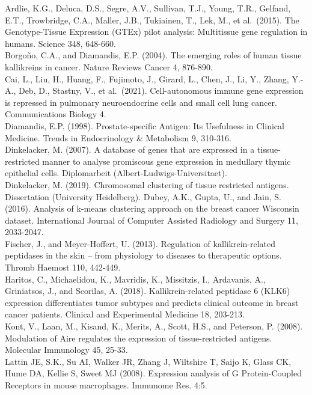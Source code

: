 \documentclass[
]{article}
\begin{document}
Ardlie, K.G., Deluca, D.S., Segre, A.V., Sullivan, T.J., Young, T.R.,
Gelfand, E.T., Trowbridge, C.A., Maller, J.B., Tukiainen, T., Lek, M.,
et al.~(2015). The Genotype-Tissue Expression (GTEx) pilot analysis:
Multitissue gene regulation in humans. Science 348, 648-660.\\
Borgoño, C.A., and Diamandis, E.P. (2004). The emerging roles of human
tissue kallikreins in cancer. Nature Reviews Cancer 4, 876-890.\\
Cai, L., Liu, H., Huang, F., Fujimoto, J., Girard, L., Chen, J., Li, Y.,
Zhang, Y.-A., Deb, D., Stastny, V., et al.~(2021). Cell-autonomous
immune gene expression is repressed in pulmonary neuroendocrine cells
and small cell lung cancer. Communications Biology 4.\\
Diamandis, E.P. (1998). Prostate-specific Antigen: Its Usefulness in
Clinical Medicine. Trends in Endocrinology \& Metabolism 9, 310-316.\\
Dinkelacker, M. (2007). A database of genes that are expressed in a
tissue-restricted manner to analyse promiscous gene expression in
medullary thymic epithelial cells. Diplomarbeit
(Albert-Ludwigs-Universitaet).\\
Dinkelacker, M. (2019). Chromosomal clustering of tissue restricted
antigens. Dissertation (University Heidelberg). Dubey, A.K., Gupta, U.,
and Jain, S. (2016). Analysis of k-means clustering approach on the
breast cancer Wisconsin dataset. International Journal of Computer
Assisted Radiology and Surgery 11, 2033-2047.\\
Fischer, J., and Meyer-Hoffert, U. (2013). Regulation of
kallikrein-related peptidases in the skin -- from physiology to diseases
to therapeutic options. Thromb Haemost 110, 442-449.\\
Haritos, C., Michaelidou, K., Mavridis, K., Missitzis, I., Ardavanis,
A., Griniatsos, J., and Scorilas, A. (2018). Kallikrein-related
peptidase 6 (KLK6) expression differentiates tumor subtypes and predicts
clinical outcome in breast cancer patients. Clinical and Experimental
Medicine 18, 203-213.\\
Kont, V., Laan, M., Kisand, K., Merits, A., Scott, H.S., and Peterson,
P. (2008). Modulation of Aire regulates the expression of
tissue-restricted antigens. Molecular Immunology 45, 25-33.\\
Lattin JE, S.K., Su AI, Walker JR, Zhang J, Wiltshire T, Saijo K, Glass
CK, Hume DA, Kellie S, Sweet MJ (2008). Expression analysis of G
Protein-Coupled Receptors in mouse macrophages. Immunome Res. 4:5.\\
\end{document}
